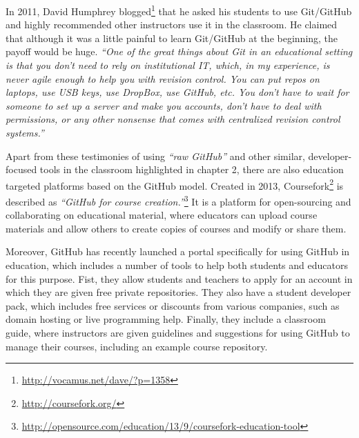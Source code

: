 In 2011, David Humphrey blogged\footnote{\url{http://vocamus.net/dave/?p=1358}} that he asked his students to use Git/GitHub and highly recommended other instructors use it in the classroom. He claimed that although it was a little painful to learn Git/GitHub at the beginning, the payoff would be huge. \textit{``One of the great things about Git in an educational setting is that you don't need to rely on institutional IT, which, in my experience, is never agile enough to help you with revision control. You can put repos on laptops, use USB keys, use DropBox, use GitHub, etc. You don't have to wait for someone to set up a server and make you accounts, don't have to deal with permissions, or any other nonsense that comes with centralized revision control systems.''}


Apart from these testimonies of using \textit{``raw GitHub''} and other similar, developer-focused tools in the classroom highlighted in chapter 2, there are also education targeted platforms based on the GitHub model. Created in 2013, Coursefork\footnote{\url{http://coursefork.org/}} is described as \textit{``GitHub for course creation.''}\footnote{\url{http://opensource.com/education/13/9/coursefork-education-tool}} It is a platform for open-sourcing and collaborating on educational material, where educators can upload course materials and allow others to create copies of courses and modify or share them.

Moreover, GitHub has recently launched a portal specifically for using GitHub in education, which includes a number of tools to help both students and educators for this purpose. Fist, they allow students and teachers to apply for an account in which they are given free private repositories. They also have a student developer pack, which includes free services or discounts from various companies, such as domain hosting or live programming help. Finally, they include a classroom guide, where instructors are given guidelines and suggestions for using GitHub to manage their courses, including an example course repository.
